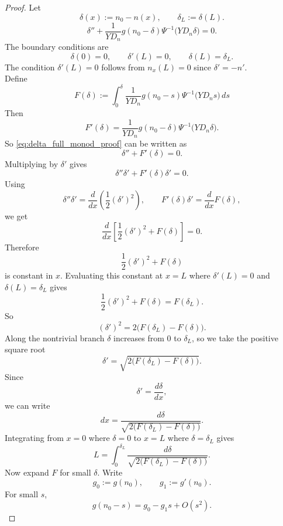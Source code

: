 \documentclass[11pt,a4paper]{report}
\begin{document}
	\begin{proof}
		Let
		\[
		\delta(x):=n_0-n(x),
		\qquad
		\delta_L:=\delta(L).
		\]
		\begin{equation}
			\delta''
			+
			\frac{1}{YD_n}g(n_0-\delta)\Psi^{-1}\!\bigl(YD_n\delta\bigr)
			=
			0.
			\label{eq:delta_full_monod_proof}
		\end{equation}
		The boundary conditions are
		\[
		\delta(0)=0,
		\qquad
		\delta'(L)=0,
		\qquad
		\delta(L)=\delta_L.
		\]
		The condition $\delta'(L)=0$ follows from $n_x(L)=0$ since $\delta'=-n'$.\\
		Define
		\begin{equation}
			F(\delta)
			:=
			\int_0^\delta
			\frac{1}{YD_n}g(n_0-s)\Psi^{-1}\!\bigl(YD_ns\bigr)\,ds
			\label{eq:F_delta_def_explicit}
		\end{equation}
		Then
		\[
		F'(\delta)
		=
		\frac{1}{YD_n}g(n_0-\delta)\Psi^{-1}\!\bigl(YD_n\delta\bigr).
		\]
		So \eqref{eq:delta_full_monod_proof} can be written as
		\[
		\delta''+F'(\delta)=0.
		\]
		Multiplying by $\delta'$ gives
		\[
		\delta''\delta'+F'(\delta)\delta'=0.
		\]
		Using
		\[
		\delta''\delta'
		=
		\frac{d}{dx}\left(\frac12(\delta')^2\right),
		\qquad
		F'(\delta)\delta'
		=
		\frac{d}{dx}F(\delta),
		\]
		we get
		\[
		\frac{d}{dx}
		\left[
		\frac12(\delta')^2+F(\delta)
		\right]
		=
		0.
		\]
		Therefore
		\[
		\frac12(\delta')^2+F(\delta)
		\]
		is constant in $x$.  Evaluating this constant at $x=L$ where
		$\delta'(L)=0$ and $\delta(L)=\delta_L$ gives
		\begin{equation}
			\frac12(\delta')^2+F(\delta)
			=
			F(\delta_L).
			\label{eq:energy_delta_explicit}
		\end{equation}
		So
		\[
		(\delta')^2
		=
		2\bigl(F(\delta_L)-F(\delta)\bigr).
		\]
		Along the nontrivial branch $\delta$ increases from $0$ to $\delta_L$,
		so we take the positive square root
		\[
		\delta'
		=
		\sqrt{2\bigl(F(\delta_L)-F(\delta)\bigr)}.
		\]
		Since
		\[
		\delta'=\frac{d\delta}{dx},
		\]
		we can write
		\[
		dx
		=
		\frac{d\delta}
		{\sqrt{2\bigl(F(\delta_L)-F(\delta)\bigr)}}.
		\]
		Integrating from $x=0$ where $\delta=0$ to $x=L$ where
		$\delta=\delta_L$ gives
		\begin{equation}
			L
			=
			\int_0^{\delta_L}
			\frac{d\delta}
			{\sqrt{2\bigl(F(\delta_L)-F(\delta)\bigr)}}.
			\label{eq:L_delta_energy_explicit}
		\end{equation}
		Now expand $F$ for small $\delta$.  Write
		\[
		g_0:=g(n_0),
		\qquad
		g_1:=g'(n_0).
		\]
		For small $s$,
		\[
		g(n_0-s)
		=
		g_0-g_1s+O(s^2).
\]
\end{proof}
\end{document}
